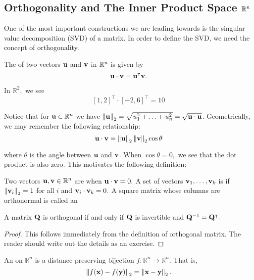 \subsection{Orthogonality and The Inner Product Space $\R^n$}

One of the most important constructions we are leading towards is the singular value decomposition (SVD) of a matrix. In order to define the SVD, we need the concept of orthogonality.

\begin{definition}
The  of two vectors $\vu$ and $\vv$ in $\R^n$ is given by 
$$\vu \cdot \vv = \vu^\intercal \vv.$$
\end{definition}

\begin{example}In $\mathbb R^2,$ we see 
$$[1,2]^\intercal \cdot [-2,6]^\intercal = 10$$
\end{example}

Notice that for $\vu\in\R^n$ we have
$\norm{\vu}_2 = \sqrt{u_1^2 + \ldots + u_n^2 } = \sqrt{\vu \cdot \vu}$. Geometrically, we may remember the following relationship: 
$$\vu \cdot \vv = \norm{\vu}_2 \norm{\vv}_2 \cos \theta$$

where $\theta$ is the angle between $\vu$ and $\vv$. When $\cos \theta = 0,$ we see that the dot product is also zero. This motivates the following definition: 

\begin{definition}Two vectors $\vu,\vv \in \mathbb R^n$ are  when $\vu \cdot \vv = 0.$
A set of vectors $\vv_1, \ldots, \vv_k$ is  if $\norm{\vv_i}_2 = 1$ for all $i$ and $\vv_i \cdot \vv_k = 0.$
A square matrix whose columns are orthonormal is called an 
\end{definition}

\begin{proposition}
A matrix $\MQ$ is orthogonal if and only if $\MQ$ is invertible and $\MQ^{-1} = \MQ^\intercal.$
\end{proposition}
\begin{proof}
This follows immediately from the definition of orthogonal matrix. The reader should write out the details as an exercise.
\end{proof}
 
\begin{definition}An  on $\mathbb R^n$ is a distance preserving bijection $f : \mathbb R^n \rightarrow \mathbb R^n$. That is, 
$$\norm{f(\vx) - f(\vy)}_2 = \norm{\vx - \vy}_2.$$
\end{definition}

